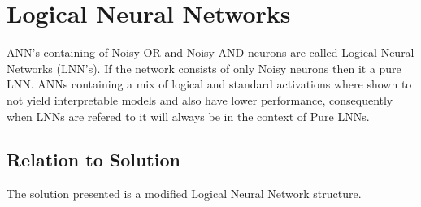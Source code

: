 \section{Logical Neural Networks}
ANN's containing of Noisy-OR and Noisy-AND neurons are called Logical Neural Networks \cite{LearningLogicalActivations} (LNN's). If the network consists of only Noisy neurons then it a pure LNN. ANNs containing a mix of logical and standard activations where shown to not yield interpretable models and also have lower performance, consequently when LNNs are refered to it will always be in the context of Pure LNNs.

\subsection{Relation to Solution}
The solution presented is a modified Logical Neural Network structure.

